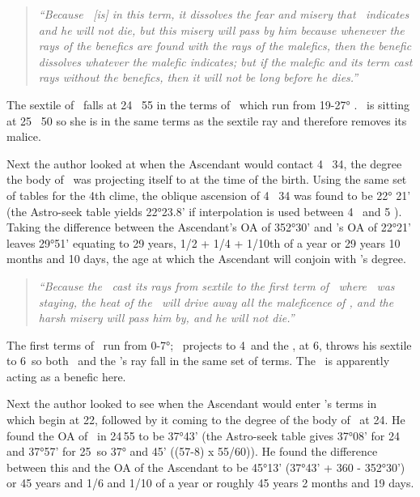 \begin{quote}
\textsl{``Because  \Venus\, [is] in this term, it dissolves the fear and misery that \Mars\, indicates and he will not die, but this misery will pass by him because whenever the rays of the benefics are found with the rays of the malefics, then the benefic dissolves whatever the malefic indicates; but if the malefic and its term cast rays without the benefics, then it will not be long before he dies.''}
\end{quote}

The sextile of \Mars\, falls at 24 \Pisces\, 55 in the terms of \Mars\, which run from 19-27° \Pisces. \Venus\, is sitting at 25 \Pisces\, 50 so she is in the same terms as the sextile ray and therefore removes its malice.

Next the author looked at when the Ascendant would contact 4 \Taurus\, 34, the degree the body of \Saturn\, was projecting itself to at the time of the birth. Using the same set of tables for the 4th clime, the oblique ascension of 4 \Taurus\, 34 was found to be 22° 21' (the Astro-seek table yields 22°23.8' if interpolation is used between 4 \Taurus\, and 5 \Taurus). Taking the difference between the Ascendant's OA of 352°30' and \Saturn's OA of 22°21' leaves 29°51' equating to 29 years, 1/2 + 1/4 + 1/10th of a year or 29 years 10 months and 10 days, the age at which the Ascendant will conjoin with \Saturn's degree.

\begin{quote}
\textsl{``Because  the \Sun\, cast its rays from sextile to the first term of \Taurus\, where \Saturn\, was staying, the heat of the \Sun\, will drive away all the maleficence of \Saturn, and the harsh misery will pass him by, and he will not die.''}
\end{quote}

The first terms of \Taurus\, run from 0-7°; \Saturn\, projects to 4\Taurus\, and the \Sun, at 6\Pisces, throws his sextile to 6\Taurus\, so both \Saturn\, and the \Sun's ray fall in the same set of terms. The \Sun\, is apparently acting as a benefic here.

Next  the author looked to see when the Ascendant would enter \Saturn's terms in \Taurus\, which begin at 22\Taurus, followed by it coming to the degree of the body of \Mars\, at 24\Taurus. He found the OA of \Mars\, in 24\Taurus\,55 to be 37°43' (the Astro-seek table gives 37°08' for 24\Taurus\, and 37°57' for 25\Taurus\, so 37° and 45' ((57-8) x 55/60)). He found the difference between this and the OA of the Ascendant to be 45°13' (37°43' + 360 - 352°30') or  45 years and 1/6 and 1/10 of a year or roughly 45 years 2 months and 19 days. 

